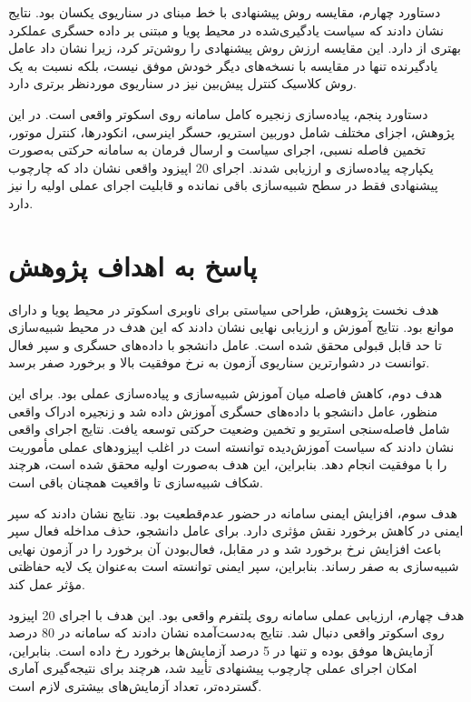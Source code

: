 دستاورد چهارم، مقایسه روش پیشنهادی با خط مبنای  در سناریوی یکسان بود. نتایج نشان دادند که سیاست یادگیری‌شده در محیط پویا و مبتنی بر داده حسگری عملکرد بهتری از  دارد. این مقایسه ارزش روش پیشنهادی را روشن‌تر کرد، زیرا نشان داد عامل یادگیرنده تنها در مقایسه با نسخه‌های دیگر خودش موفق نیست، بلکه نسبت به یک روش کلاسیک کنترل پیش‌بین نیز در سناریوی موردنظر برتری دارد.

دستاورد پنجم، پیاده‌سازی زنجیره کامل سامانه روی اسکوتر واقعی است. در این پژوهش، اجزای مختلف شامل دوربین استریو، حسگر اینرسی، انکودرها، کنترل موتور، تخمین فاصله نسبی، اجرای سیاست و ارسال فرمان به سامانه حرکتی به‌صورت یکپارچه پیاده‌سازی و ارزیابی شدند. اجرای 20 اپیزود واقعی نشان داد که چارچوب پیشنهادی فقط در سطح شبیه‌سازی باقی نمانده و قابلیت اجرای عملی اولیه را نیز دارد.

\section{پاسخ به اهداف پژوهش}
\label{sec:objectives_response}

هدف نخست پژوهش، طراحی سیاستی برای ناوبری اسکوتر در محیط پویا و دارای موانع بود. نتایج آموزش و ارزیابی نهایی نشان دادند که این هدف در محیط شبیه‌سازی تا حد قابل قبولی محقق شده است. عامل دانشجو با داده‌های حسگری و سپر فعال توانست در دشوارترین سناریوی آزمون به نرخ موفقیت بالا و برخورد صفر برسد.

هدف دوم، کاهش فاصله میان آموزش شبیه‌سازی و پیاده‌سازی عملی بود. برای این منظور، عامل دانشجو با داده‌های حسگری آموزش داده شد و زنجیره ادراک واقعی شامل فاصله‌سنجی استریو و تخمین وضعیت حرکتی توسعه یافت. نتایج اجرای واقعی نشان دادند که سیاست آموزش‌دیده توانسته است در اغلب اپیزودهای عملی مأموریت را با موفقیت انجام دهد. بنابراین، این هدف به‌صورت اولیه محقق شده است، هرچند شکاف شبیه‌سازی تا واقعیت همچنان باقی است.

هدف سوم، افزایش ایمنی سامانه در حضور عدم‌قطعیت بود. نتایج نشان دادند که سپر ایمنی در کاهش برخورد نقش مؤثری دارد. برای عامل دانشجو، حذف مداخله فعال سپر باعث افزایش نرخ برخورد شد و در مقابل، فعال‌بودن آن برخورد را در آزمون نهایی شبیه‌سازی به صفر رساند. بنابراین، سپر ایمنی توانسته است به‌عنوان یک لایه حفاظتی مؤثر عمل کند.

هدف چهارم، ارزیابی عملی سامانه روی پلتفرم واقعی بود. این هدف با اجرای 20 اپیزود روی اسکوتر واقعی دنبال شد. نتایج به‌دست‌آمده نشان دادند که سامانه در 80 درصد آزمایش‌ها موفق بوده و تنها در 5 درصد آزمایش‌ها برخورد رخ داده است. بنابراین، امکان اجرای عملی چارچوب پیشنهادی تأیید شد، هرچند برای نتیجه‌گیری آماری گسترده‌تر، تعداد آزمایش‌های بیشتری لازم است.

